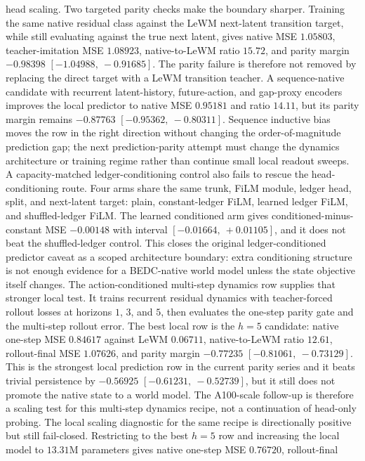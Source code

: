 head scaling.
Two targeted parity checks make the boundary sharper.  Training the same
native residual class against the LeWM next-latent transition target, while
still evaluating against the true next latent, gives native MSE $1.05803$,
teacher-imitation MSE $1.08923$, native-to-LeWM ratio $15.72$, and parity
margin $-0.98398$ $[-1.04988,\ -0.91685]$.  The parity failure is therefore
not removed by replacing the direct target with a LeWM transition teacher.
A sequence-native candidate with recurrent latent-history, future-action, and
gap-proxy encoders improves the local predictor to native MSE $0.95181$ and
ratio $14.11$, but its parity margin remains $-0.87763$
$[-0.95362,\ -0.80311]$.  Sequence inductive bias moves the row in the right
direction without changing the order-of-magnitude prediction gap; the next
prediction-parity attempt must change the dynamics architecture or training
regime rather than continue small local readout sweeps.
A capacity-matched ledger-conditioning control also fails to rescue the
head-conditioning route.  Four arms share the same trunk, FiLM module, ledger
head, split, and next-latent target: plain, constant-ledger FiLM, learned
ledger FiLM, and shuffled-ledger FiLM.  The learned conditioned arm gives
conditioned-minus-constant MSE $-0.00148$ with interval
$[-0.01664,\ +0.01105]$, and it does not beat the shuffled-ledger control.
This closes the original ledger-conditioned predictor caveat as a scoped
architecture boundary: extra conditioning structure is not enough evidence for
a BEDC-native world model unless the state objective itself changes.
The action-conditioned multi-step dynamics row supplies that stronger local
test.  It trains recurrent residual dynamics with teacher-forced rollout
losses at horizons $1$, $3$, and $5$, then evaluates the one-step parity gate
and the multi-step rollout error.  The best local row is the $h=5$ candidate:
native one-step MSE $0.84617$ against LeWM $0.06711$, native-to-LeWM ratio
$12.61$, rollout-final MSE $1.07626$, and parity margin $-0.77235$
$[-0.81061,\ -0.73129]$.  This is the strongest local prediction row in the
current parity series and it beats trivial persistence by $-0.56925$
$[-0.61231,\ -0.52739]$, but it still does not promote the native state to a
world model.  The A100-scale follow-up is therefore a scaling test for this
multi-step dynamics recipe, not a continuation of head-only probing.
The local scaling diagnostic for the same recipe is directionally positive but
still fail-closed.  Restricting to the best $h=5$ row and increasing the local
model to $13.31$M parameters gives native one-step MSE $0.76720$, rollout-final
